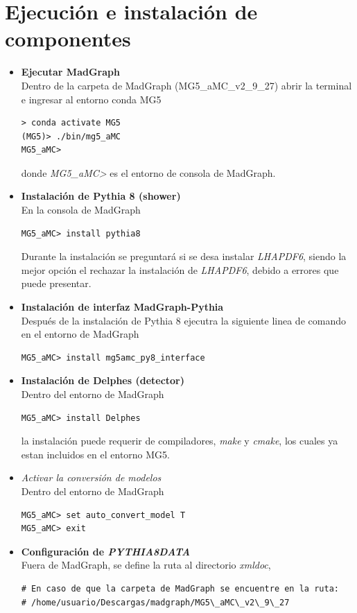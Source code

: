 \section{Ejecución e instalación de componentes}
\begin{itemize}
    \item[1)] \textbf{Ejecutar MadGraph}\\
    Dentro de la carpeta de MadGraph (MG5\_aMC\_v2\_9\_27) abrir la terminal e ingresar al entorno conda MG5
\begin{lstlisting}
> conda activate MG5
(MG5)> ./bin/mg5_aMC
MG5_aMC>
\end{lstlisting}
    donde \textit{MG5\_aMC>} es el entorno de consola de MadGraph.
    \item[2)] \textbf{Instalación de Pythia 8 (shower)}\\
    En la consola de MadGraph
\begin{lstlisting}
MG5_aMC> install pythia8
\end{lstlisting}
    Durante la instalación se preguntará si se desa instalar \textit{LHAPDF6}, siendo la mejor opción el rechazar la instalación de \textit{LHAPDF6}, debido a errores que puede presentar.
    \item[3)] \textbf{Instalación de interfaz MadGraph-Pythia}\\
    Después de la instalación de Pythia 8 ejecutra la siguiente linea de comando en el entorno de MadGraph
\begin{lstlisting}
MG5_aMC> install mg5amc_py8_interface
\end{lstlisting}
    \item[4)] \textbf{Instalación de Delphes (detector)}\\
    Dentro del entorno de MadGraph
\begin{lstlisting}
MG5_aMC> install Delphes
\end{lstlisting}
    la instalación puede requerir de compiladores, \textit{make} y \textit{cmake}, los cuales ya estan incluidos en el entorno MG5.
    \item[5)] \textit{Activar la conversión de modelos}\\
    Dentro del entorno de MadGraph
\begin{lstlisting}
MG5_aMC> set auto_convert_model T
MG5_aMC> exit
\end{lstlisting}
    \item[6)] \textbf{Configuración de \textit{PYTHIA8DATA}}\\
    Fuera de MadGraph, se define la ruta al directorio \textit{xmldoc},
\begin{lstlisting}
# En caso de que la carpeta de MadGraph se encuentre en la ruta:
# /home/usuario/Descargas/madgraph/MG5\_aMC\_v2\_9\_27


\end{lstlisting}
\end{itemize}
